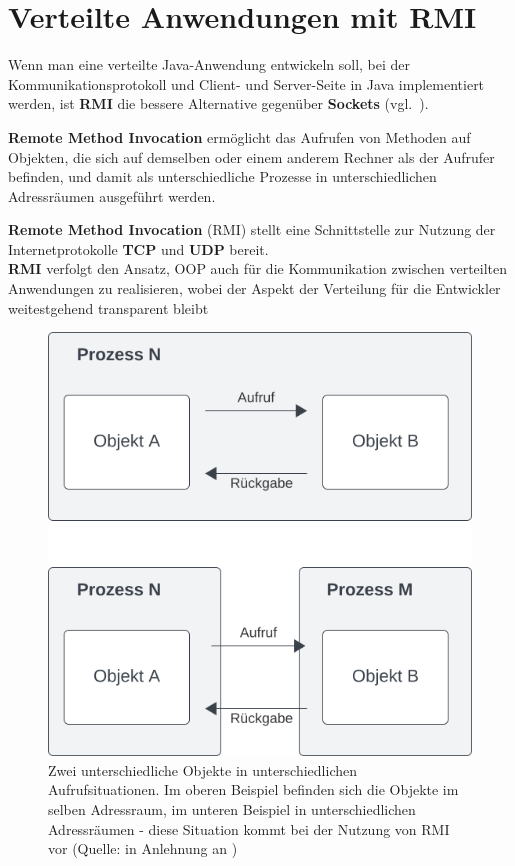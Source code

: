 \section{Verteilte Anwendungen mit RMI}

Wenn man eine verteilte Java-Anwendung entwickeln soll, bei der Kommunikationsprotokoll und Client- und Server-Seite in Java implementiert werden, ist \textbf{RMI} die bessere Alternative gegenüber  \textbf{Sockets} (vgl.~\cite[311]{Oec22}).\\


\begin{tcolorbox}
    \textbf{Remote Method Invocation} ermöglicht das Aufrufen von Methoden auf Objekten, die sich auf demselben oder einem anderem Rechner als der Aufrufer befinden, und damit als unterschiedliche Prozesse in unterschiedlichen Adressräumen ausgeführt werden.
\end{tcolorbox}

\noindent
\textbf{Remote Method Invocation} (RMI) stellt eine Schnittstelle zur Nutzung der Internetprotokolle \textbf{TCP} und \textbf{UDP} bereit.\\

\noindent
\textbf{RMI} verfolgt den Ansatz, OOP auch für die Kommunikation zwischen verteilten Anwendungen zu realisieren, wobei der Aspekt der Verteilung für die Entwickler weitestgehend transparent bleibt

\begin{figure}
    \centering
    \includegraphics[scale=0.5]{chapters/fopt5/img/rmi/processcall}
    \caption{Zwei unterschiedliche Objekte in unterschiedlichen Aufrufsituationen. Im oberen Beispiel befinden sich die Objekte im selben Adressraum, im unteren Beispiel in unterschiedlichen Adressräumen - diese Situation kommt bei der Nutzung von RMI vor (Quelle: in Anlehnung an \cite[311 f., Abbildung 6.1 und 6.2]{Oec22})}
    \label{fig:processcall}
\end{figure}

